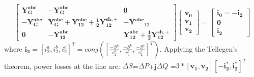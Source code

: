 \documentclass[12pt]{article}
\begin{document}
\begin{equation}
 \left[ \begin{array}{ccc}\label{4}
 \mathbf{{Y}^{abc}_{G}} & - \mathbf{{Y}^{abc}_{G}}  &\mathbf{0} \\
 - \mathbf{{Y}^{abc}_{G}} &  \mathbf{{Y}^{abc}_{G}+{Y}^{abc}_{12}+\frac{1}{2}{Y}^{sh,+}_{12}} & -\mathbf{{Y}^{abc}}_{12}\\
 \mathbf{0} & -\mathbf{{Y}^{abc}_{12}} & \mathbf{{Y}^{abc}_{12}+\frac{1}{2}{Y}^{sh,+}_{12}}
             \end{array}
           \right]
  \begin{bmatrix}
  \bm{v_0}\\ 
	\bm{v_1}\\ 
	\bm{v_2}
\end{bmatrix}
  =
  \begin{bmatrix}
\bm{i_0}=-\bm{i_2}\\ 
\bm{0}\\ 
\bm{i_2}
\end{bmatrix}
  \end{equation}
where $\bm{i_2}=[i^a_2, i^b_2,i^c_2]^T=conj([\frac{-{S^a}}{{v}^a_2},\frac{-{S^b}}{{v}^b_2},\frac{-{S^c}}{{v}^c_2}]^T)$. Applying the Tellegen's theorem, power losses at the line are: $\Delta {S}$=$\Delta P$+j$\Delta Q$ 
=$3*[\bm{v_1},\bm{v_2}][-\bm{i^*_2},\bm{i^*_2}]^T$
\end{document}
